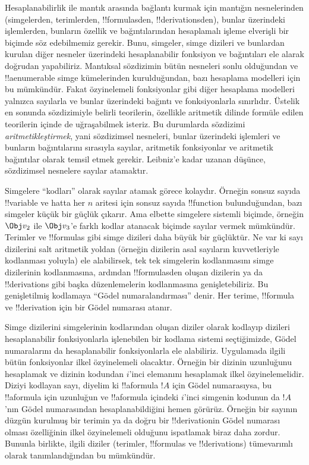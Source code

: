 


Hesaplanabilirlik ile mantık arasında bağlantı kurmak için mantığın
nesnelerinden (simgelerden, terimlerden, !!{formula}s{}den,
!!{derivation}s{}den), bunlar üzerindeki işlemlerden, bunların özellik ve
bağıntılarından hesaplamalı işleme elverişli bir biçimde söz edebilmemiz
gerekir. Bunu, simgeler, simge dizileri ve bunlardan kurulan diğer nesneler
üzerindeki hesaplanabilir fonksiyon ve bağıntıları ele alarak doğrudan
yapabiliriz. Mantıksal sözdizimin bütün nesneleri sonlu olduğundan ve
!!a{enumerable} simge kümelerinden kurulduğundan, bazı hesaplama modelleri
için bu mümkündür. Fakat özyinelemeli fonksiyonlar gibi diğer hesaplama
modelleri yalnızca sayılarla ve bunlar üzerindeki bağıntı ve fonksiyonlarla
sınırlıdır. Üstelik en sonunda sözdizimiyle belirli teorilerin, özellikle
aritmetik dilinde formüle edilen teorilerin içinde de uğraşabilmek isteriz.
Bu durumlarda sözdizimi \emph{aritmetikleştirmek}, yani sözdizimsel nesneleri,
bunlar üzerindeki işlemleri ve bunların bağıntılarını sırasıyla sayılar,
aritmetik fonksiyonlar ve aritmetik bağıntılar olarak temsil etmek gerekir.
Leibniz'e kadar uzanan düşünce, sözdizimsel nesnelere sayılar atamaktır.

Simgelere ``kodları'' olarak sayılar atamak görece kolaydır. Örneğin sonsuz
sayıda !!{variable} ve hatta her $n$ aritesi için sonsuz sayıda
!!{function} bulunduğundan, bazı simgeler küçük bir güçlük çıkarır. Ama
elbette simgelere sistemli biçimde, örneğin $\Obj v_2$ ile $\Obj v_3$'e
farklı kodlar atanacak biçimde sayılar vermek mümkündür. Terimler ve
!!{formula}s gibi simge dizileri daha büyük bir güçlüktür. Ne var ki sayı
dizilerini salt aritmetik yoldan (örneğin dizilerin asal sayıların kuvvetleriyle
kodlanması yoluyla) ele alabilirsek, tek tek simgelerin kodlanmasını simge
dizilerinin kodlanmasına, ardından !!{formula}s{}den oluşan dizilerin ya da
!!{derivation}s gibi başka düzenlemelerin kodlanmasına genişletebiliriz.
Bu genişletilmiş kodlamaya ``Gödel numaralandırması'' denir. Her terime,
!!{formula} ve !!{derivation} için bir Gödel numarası atanır.

Simge dizilerini simgelerinin kodlarından oluşan diziler olarak kodlayıp
dizileri hesaplanabilir fonksiyonlarla işlenebilen bir kodlama sistemi
seçtiğimizde, Gödel numaralarını da hesaplanabilir fonksiyonlarla ele
alabiliriz. Uygulamada ilgili bütün fonksiyonlar ilkel özyinelemeli olacaktır.
Örneğin bir dizinin uzunluğunu hesaplamak ve dizinin kodundan $i$'inci
elemanını hesaplamak ilkel özyinelemelidir. Diziyi kodlayan sayı, diyelim ki
!!a{formula} $!A$ için Gödel numarasıysa, bu !!a{formula} için uzunluğun ve
!!a{formula} içindeki $i$'inci simgenin kodunun da $!A$'nın Gödel numarasından
hesaplanabildiğini hemen görürüz. Örneğin bir sayının düzgün kurulmuş bir
terimin ya da doğru bir !!{derivation}{}in Gödel numarası olması özelliğinin
ilkel özyinelemeli olduğunu ispatlamak biraz daha zordur. Bununla birlikte,
ilgili diziler (terimler, !!{formula}s ve !!{derivation}s) tümevarımlı olarak
tanımlandığından bu mümkündür.


